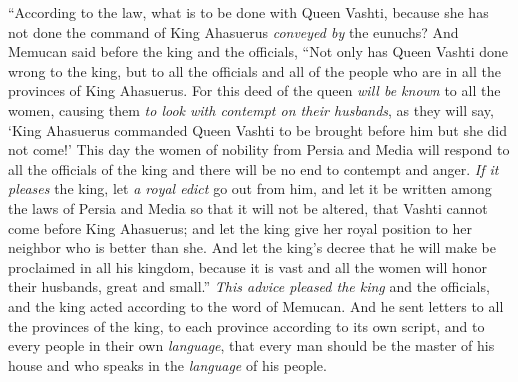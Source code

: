 \begin{biblechapter}
\verse “According to the law, what is to be done with Queen Vashti, because she has not done the command of King Ahasuerus \textit{conveyed by} the eunuchs?
\verse And Memucan said before the king and the officials, “Not only has Queen Vashti done wrong to the king, but to all the officials and all of the people who are in all the provinces of King Ahasuerus.
\verse For this deed of the queen \textit{will be known} to all the women, causing them \textit{to look with contempt on their husbands}, as they will say, ‘King Ahasuerus commanded Queen Vashti to be brought before him but she did not come!’
\verse This day the women of nobility from Persia and Media will respond to all the officials of the king and there will be no end to contempt and anger.
\verse \textit{If it pleases} the king, let \textit{a royal edict} go out from him, and let it be written among the laws of Persia and Media so that it will not be altered, that Vashti cannot come before King Ahasuerus; and let the king give her royal position to her neighbor who is better than she.
\verse And let the king’s decree that he will make be proclaimed in all his kingdom, because it is vast and all the women will honor their husbands, great and small.”
\verse \textit{This advice pleased the king} and the officials, and the king acted according to the word of Memucan.
\verse And he sent letters to all the provinces of the king, to each province according to its own script, and to every people in their own \textit{language}, that every man should be the master of his house and who speaks in the \textit{language} of his people.
\end{biblechapter}

